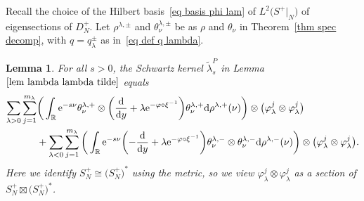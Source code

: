 \documentclass[10pt,a4paper]{amsart}
\numberwithin{equation}{section}
\newtheorem{Lemma}[Theorem]{Lemma}
\newcommand{\R}{\mathbb{R}}
\begin{document}
 Recall the choice of the Hilbert basis~\eqref{eq basis phi lam} of $L^2\big(S^+|_N\big)$ of eigensections of $D_N^+$. Let $\rho^{\lambda, \pm}$ and $\theta^{\lambda, \pm}_{\nu}$ be as $\rho$ and $\theta_{\nu}$ in Theorem~\ref{thm spec decomp}, with $q = q^{\pm}_{\lambda}$ as in~\eqref{eq def q lambda}.
\begin{Lemma}\label{lem kernel APS}
For all $s>0$, the Schwartz kernel $\tilde \lambda_s^{P}$ in Lemma~$\ref{lem lambda lambda tilde}$ equals
\begin{align}
\sum_{\lambda >0} \sum_{j=1}^{m_{\lambda}}&\bigg(\int_{\R}
{\rm e}^{-s\nu} \theta^{\lambda, +}_{\nu}\otimes \bigg( \frac{\rm d}{{\rm d}y}+\lambda {\rm e}^{-\varphi \circ \xi^{-1}}\bigg) \theta^{\lambda, +}_{\nu} {\rm d}\rho^{\lambda, +}(\nu) \bigg)\otimes \big(\varphi_{\lambda}^j \otimes \varphi_{\lambda}^j \big)\nonumber
\\
&+ \sum_{\lambda <0}
 \sum_{j=1}^{m_{\lambda}}
\bigg(\int_{\R}
{\rm e}^{-s\nu} \biggl( - \frac{\rm d}{{\rm d}y}+\lambda {\rm e}^{-\varphi \circ \xi^{-1}}\biggr)\theta^{\lambda, -}_{\nu}\otimes \theta^{\lambda, -}_{\nu} {\rm d}\rho^{\lambda, -}(\nu) \bigg)\otimes \big(\varphi_{\lambda}^j \otimes \varphi_{\lambda}^j \big).
\label{eq kernel cusp contr}
\end{align}
Here we identify $S^+_N \cong \big(S^+_N\big)^*$ using the metric, so we view $\varphi_{\lambda}^j \otimes \varphi_{\lambda}^j$ as a section of $S^+_N \boxtimes \big(S^+_N\big)^*$.
\end{Lemma}
\end{document}
